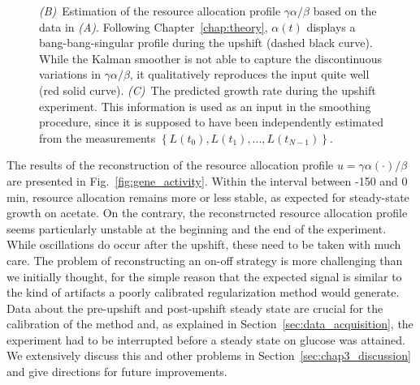 \begin{figure}[p]
{\textit{(B)}~Estimation of the resource allocation profile $\gamma \alpha / \beta$ based on the data in \textit{(A)}.
Following Chapter~\ref{chap:theory}, $\alpha (t)$ displays a bang-bang-singular profile during the upshift (dashed black curve).
While the Kalman smoother is not able to capture the discontinuous variations in $\gamma \alpha / \beta$, it qualitatively reproduces the input quite well (red solid curve).
\textit{(C)}~The predicted growth rate during the upshift experiment.
This information is used as an input in the smoothing procedure, since it is supposed to have been independently estimated from the measurements $\left\{L(t_0), L(t_1), ..., L(t_{N-1}) \right\}$.
}
\label{fig:synthetic_upshift}
\end{figure}

The results of the reconstruction of the resource allocation profile $u = \gamma \alpha (\cdot) / \beta$ are presented in Fig.~\ref{fig:gene_activity}.
Within the interval between -150 and 0 min, resource allocation remains more or less stable, as expected for steady-state growth on acetate.
On the contrary, the reconstructed resource allocation profile seems particularly unstable at the beginning and the end of the experiment.
While oscillations do occur after the upshift, these need to be taken with much care.
The problem of reconstructing an on-off strategy is more challenging than we initially thought, for the simple reason that the expected signal is similar to the kind of artifacts a poorly calibrated regularization method would generate.
Data about the pre-upshift and post-upshift steady state are crucial for the calibration of the method and, as explained in Section~\ref{sec:data_acquisition}, the experiment had to be interrupted before a steady state on glucose was attained.
We extensively discuss this and other problems in Section~\ref{sec:chap3_discussion} and give directions for future improvements.

